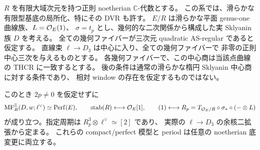 \begin{corollary}
\label{mbrn:cor:factor-boundary}
$R$ を有限大域次元を持つ正則 noetherian $\mathbb C$-代数とする。
この系では、滑らかな有限型基底の局所化、特にその DVR も許す。
$E/R$ は滑らかな平面 genus-one 曲線族、$L=\mathcal O_E(1)$、
$\sigma=t_p$ とし、幾何的な二次関係から構成した実 Sklyanin 族 $D$ を考える。
全ての幾何ファイバーが三次元 quadratic AS-regular であると仮定する。
直線束 $\ell\to D_3$ は中心に入り、全ての幾何ファイバーで
非零の正則中心三次を与えるものとする。
各幾何ファイバーで、この中心商は当該点曲線の THCR に一致するとする。
後の条件は通常の滑らかな楕円 Sklyanin 中心商に対する条件であり、
相対 window の存在を仮定するものではない。

このとき $2p\ne0$ を仮定せずに
\[
 \operatorname{MF}^{\mathbb Z}_R(D,w;\ell^\vee)\simeq\operatorname{Perf}(E),\qquad
 \operatorname{stab}(R)\longleftrightarrow\mathcal O_E[1],\qquad
 (1)\longleftrightarrow
       R_p=T_{\mathcal O_E/R}\circ\sigma_*\circ(-\otimes L)
\]
が成り立つ。指定周期は
$R_p^3\otimes\ell^\vee\simeq[2]$ であり、
実際の $\ell\to D_3$ の余核二拡張から定まる。
これらの compact/perfect 模型と period は任意の noetherian 底変更に両立する。
\end{corollary}
